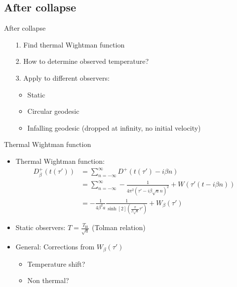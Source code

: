 \documentclass{beamer}
\newcommand{\ind}[1]{_\mathrm{#1}}
\begin{document}
\subsection{After collapse}
\begin{frame}{After collapse}
\begin{itemize}
	\item[1.] Find thermal Wightman function
	\item[]
	\item[2.] How to determine observed temperature?
	\item[]
	\item[3.] Apply to different observers:
	\begin{itemize}
		\item Static
		\item Circular geodesic
		\item Infalling geodesic (dropped at infinity, no initial velocity)
	\end{itemize}
\end{itemize}
\end{frame}


\begin{frame}{Thermal Wightman function}

\begin{itemize}
	\item Thermal Wightman function:
	\begin{align*}
		D_\beta^+(t(\tau')) &= \sum_{n=-\infty}^\infty D^+(t(\tau') - i \beta n)\\
			&= \sum_{n=-\infty}^\infty -\frac{1}{4\pi^2 (\tau' - i\beta \sqrt{a} n)^2} + W(\tau'(t - i\beta n))\\
			&= -\frac{1}{4\beta^2 a} \frac{1}{\sinh[2](\frac{\pi}{\beta \sqrt{a}} \tau')} + W_\beta(\tau')
	\end{align*}
	\item Static observers: \(T = \frac{T\ind{H}}{\sqrt{a}}\) (Tolman relation)
	\item General: Corrections from \(W_\beta(\tau')\)
	\begin{itemize}
		\item Temperature shift?
		\item Non thermal?
	\end{itemize}
\end{itemize}
\end{frame}
\end{document}
